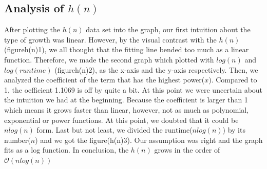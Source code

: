 \documentclass[titlepage, 12pt]{article}
\begin{document}
\subsection{Analysis of $h(n)$}
After plotting the $h(n)$ data set into the graph, our first intuition about the 
type of growth was linear. However, by the visual contrast with the $h(n)$ (figureh(n)1), 
we all thought that the fitting line bended too much as a linear function. 
Therefore, we made the second graph which plotted with $log(n)$ and $log(runtime)$ 
(figureh(n)2), as the x-axis and the y-axis respectively. Then, we analyzed the 
coefficient of the term that has the highest power($x$). Compared to 1, the 
oefficient 1.1069 is off by quite a bit. At this point we were uncertain about 
the intuition we had at the beginning. Because the coefficient is larger than 1 
which means it grows faster than linear, however, not as much as polynomial, 
exponential or power functions. At this point, we doubted that it could be $nlog(n)$ 
form. Last but not least, we divided the runtime($nlog(n)$) by its number($n$) and we 
got the figure(h(n)3). Our assumption was right and the graph fits as a log function. 
In conclusion, the $h(n)$ grows in the order of $\mathcal{O}(nlog(n))$
\end{document}
